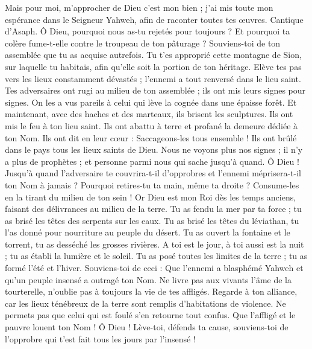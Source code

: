 \begin{multicols}{2}
Mais pour moi, m'approcher de Dieu c'est mon bien ; j'ai mis toute mon espérance dans le Seigneur Yahweh, afin de raconter toutes tes œuvres.
\VerseOne{}Cantique d'Asaph. Ô Dieu, pourquoi nous as-tu rejetés pour toujours ? Et pourquoi ta colère fume-t-elle contre le troupeau de ton pâturage ?
Souviens-toi de ton assemblée que tu as acquise autrefois. Tu t'es approprié cette montagne de Sion, sur laquelle tu habitais, afin qu'elle soit la portion de ton héritage.
Elève tes pas vers les lieux constamment dévastés ; l'ennemi a tout renversé dans le lieu saint.
Tes adversaires ont rugi au milieu de ton assemblée ; ils ont mis leurs signes pour signes.
On les a vus pareils à celui qui lève la cognée dans une épaisse forêt.
Et maintenant, avec des haches et des marteaux, ils brisent les sculptures.
Ils ont mis le feu à ton lieu saint. Ils ont abattu à terre et profané la demeure dédiée à ton Nom.
Ils ont dit en leur cœur : Saccageons-les tous ensemble ! Ils ont brûlé dans le pays tous les lieux saints de Dieu.
Nous ne voyons plus nos signes ; il n'y a plus de prophètes ; et personne parmi nous qui sache jusqu'à quand.
Ô Dieu ! Jusqu'à quand l'adversaire te couvrira-t-il d'opprobres et l'ennemi méprisera-t-il ton Nom à jamais ?
Pourquoi retires-tu ta main, même ta droite ? Consume-les en la tirant du milieu de ton sein !
Or Dieu est mon Roi dès les temps anciens, faisant des délivrances au milieu de la terre.
Tu as fendu la mer par ta force ; tu as brisé les têtes des serpents sur les eaux.
Tu as brisé les têtes du léviathan, tu l'as donné pour nourriture au peuple du désert.
Tu as ouvert la fontaine et le torrent, tu as desséché les grosses rivières.
A toi est le jour, à toi aussi est la nuit ; tu as établi la lumière et le soleil.
Tu as posé toutes les limites de la terre ; tu as formé l'été et l'hiver.
Souviens-toi de ceci : Que l'ennemi a blasphémé Yahweh et qu'un peuple insensé a outragé ton Nom.
Ne livre pas aux vivants l'âme de la tourterelle, n'oublie pas à toujours la vie de tes affligés.
Regarde à ton alliance, car les lieux ténébreux de la terre sont remplis d'habitations de violence.
Ne permets pas que celui qui est foulé s'en retourne tout confus. Que l'affligé et le pauvre louent ton Nom !
Ô Dieu ! Lève-toi, défends ta cause, souviens-toi de l'opprobre qui t'est fait tous les jours par l'insensé !

\end{multicols}
